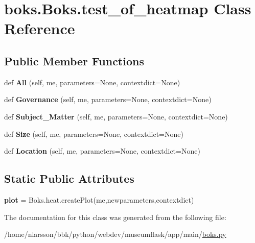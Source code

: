 \hypertarget{classboks_1_1Boks_1_1test__of__heatmap}{}\section{boks.\+Boks.\+test\+\_\+of\+\_\+heatmap Class Reference}
\label{classboks_1_1Boks_1_1test__of__heatmap}
\subsection*{Public Member Functions}
\begin{DoxyCompactItemize}
\item 
\mbox{\label{classboks_1_1Boks_1_1test__of__heatmap_a092cfb0295cbbc0face7eba6a186b940}} 
def {\bfseries All} (self, me, parameters=None, contextdict=None)
\item 
\mbox{\label{classboks_1_1Boks_1_1test__of__heatmap_a813438b749f93169974d31c440afb1d7}} 
def {\bfseries Governance} (self, me, parameters=None, contextdict=None)
\item 
\mbox{\label{classboks_1_1Boks_1_1test__of__heatmap_a421157b698b124e590452b59b4797473}} 
def {\bfseries Subject\+\_\+\+Matter} (self, me, parameters=None, contextdict=None)
\item 
\mbox{\label{classboks_1_1Boks_1_1test__of__heatmap_acf3b430698e07b7c4a6071b6ab26d477}} 
def {\bfseries Size} (self, me, parameters=None, contextdict=None)
\item 
\mbox{\label{classboks_1_1Boks_1_1test__of__heatmap_a0172f240a6c67ee36903f4216966d1e2}} 
def {\bfseries Location} (self, me, parameters=None, contextdict=None)
\end{DoxyCompactItemize}
\subsection*{Static Public Attributes}
\begin{DoxyCompactItemize}
\item 
\mbox{\label{classboks_1_1Boks_1_1test__of__heatmap_ac0c3e33e3f194dae3695ee254731b05a}} 
{\bfseries plot} = Boks.\+heat.\+create\+Plot(me,newparameters,contextdict)
\end{DoxyCompactItemize}


The documentation for this class was generated from the following file\+:\begin{DoxyCompactItemize}
\item 
/home/nlarsson/bbk/python/webdev/museumflask/app/main/\mbox{\hyperlink{boks_8py}{boks.\+py}}\end{DoxyCompactItemize}
